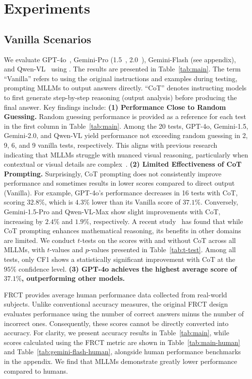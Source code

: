 \section{Experiments}

\subsection{Vanilla Scenarios}

We evaluate GPT-4o~\cite{openai2024hello}, Gemini-Pro (1.5~\cite{pichai2024our}, 2.0~\cite{pichai2024introducing}), Gemini-Flash (see appendix), and Qwen-VL~\cite{bai2023qwen} using {\methodname}.
The results are presented in Table~\ref{tab:main}.
The term ``Vanilla'' refers to using the original instructions and examples during testing, prompting MLLMs to output answers directly.
``CoT'' denotes instructing models to first generate step-by-step reasoning (output analysis) before producing the final answer.
Key findings include:
\textbf{(1) Performance Close to Random Guessing.}
Random guessing performance is provided as a reference for each test in the first column in Table~\ref{tab:main}.
Among the 20 tests, GPT-4o, Gemini-1.5, Gemini-2.0, and Qwen-VL yield performance not exceeding random guessing in 2, 9, 6, and 9 vanilla tests, respectively.
This aligns with previous research indicating that MLLMs struggle with nuanced visual reasoning, particularly when contextual or visual details are complex~\cite{fu2024blink, wu2024surprising}.
\textbf{(2) Limited Effectiveness of CoT Prompting.}
Surprisingly, CoT prompting does not consistently improve performance and sometimes results in lower scores compared to direct output (Vanilla).
For example, GPT-4o's performance decreases in 16 tests with CoT, scoring $32.8\%$, which is $4.3\%$ lower than its Vanilla score of $37.1\%$.
Conversely, Gemini-1.5-Pro and Qwen-VL-Max show slight improvements with CoT, increasing by $2.4\%$ and $1.9\%$, respectively.
A recent study~\cite{sprague2025cot} has found that while CoT prompting enhances mathematical reasoning, its benefits in other domains are limited.
We conduct $t$-tests on the scores with and without CoT across all MLLMs, with $t$-values and $p$-values presented in Table~\ref{tab:t-test}.
Among all tests, only CF1 shows a statistically significant improvement with CoT at the $95\%$ confidence level.
\textbf{(3) GPT-4o achieves the highest average score of $37.1\%$, outperforming other models.}

FRCT provides average human performance data collected from real-world subjects.
Unlike conventional accuracy measures, the original FRCT design evaluates performance using the number of correct answers minus the number of incorrect ones.
Consequently, these scores cannot be directly converted into accuracy.
For clarity, we present accuracy results in Table~\ref{tab:main}, while scores calculated using the FRCT metric are shown in Table~\ref{tab:main-human} and Table~\ref{tab:gemini-flash-human}, alongside human performance benchmarks in the appendix.
We find that MLLMs demonstrate greatly lower performance compared to humans.

